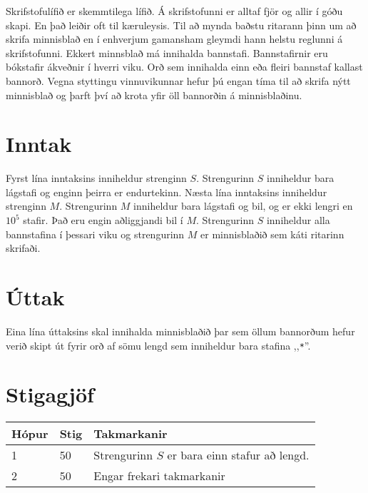 %
Skrifstofulífið er skemmtilega lífið.
Á skrifstofunni er alltaf fjör og allir í góðu skapi.
En það leiðir oft til kæruleysis.
Til að mynda baðstu ritarann þinn um að skrifa minnisblað en í enhverjum gamansham gleymdi hann helstu reglunni á skrifstofunni.
Ekkert minnsblað má innihalda bannstafi.
Bannstafirnir eru bókstafir ákveðnir í hverri viku.
Orð sem innihalda einn eða fleiri bannstaf kallast bannorð.
Vegna styttingu vinnuvikunnar hefur þú engan tíma til að skrifa nýtt minnisblað og þarft því að krota yfir öll bannorðin á minnisblaðinu.

\section*{Inntak}
Fyrst lína inntaksins inniheldur strenginn $S$.
Strengurinn $S$ inniheldur bara lágstafi og enginn þeirra er endurtekinn.
Næsta lína inntaksins inniheldur strenginn $M$.
Strengurinn $M$ inniheldur bara lágstafi og bil, og er ekki lengri en $10^5$ stafir.
Það eru engin aðliggjandi bil í $M$.
Strengurinn $S$ inniheldur alla bannstafina í þessari viku og strengurinn $M$ er minnisblaðið sem káti ritarinn skrifaði.

\section*{Úttak}
Eina lína úttaksins skal innihalda minnisblaðið þar sem öllum bannorðum hefur verið skipt út fyrir orð af sömu lengd sem inniheldur bara stafina ,,\texttt{*}''.

\section*{Stigagjöf}
\begin{tabular}{|l|l|l|}
\hline
Hópur & Stig & Takmarkanir \\ \hline
1     & 50   & Strengurinn $S$ er bara einn stafur að lengd.\\ \hline
2     & 50   & Engar frekari takmarkanir\\ \hline
\end{tabular}

